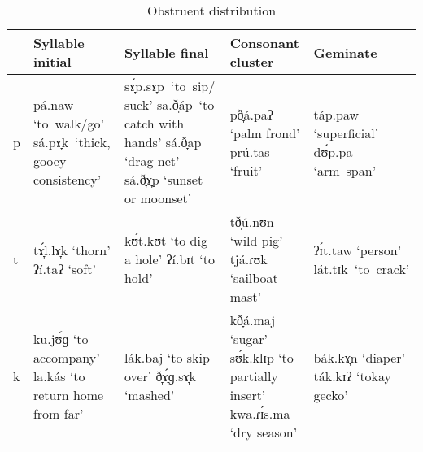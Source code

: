 \begin{table}[b]
\caption{Obstruent distribution}
\label{tab2.2} 
\begin{tabularx}{\textwidth}{lQQQQ}
\lsptoprule 
 & Syllable initial & Syllable final & Consonant cluster & Geminate \\
\midrule
 p & pá.naw \newline ‘to~walk/go’
 \newline 
 sá.pɤ̞k~\newline ‘thick, gooey consistency’ &
sɤ̞́p.sɤ̞p~\newline ‘to~sip/ suck’
\newline
sa.ð̞áp~\newline ‘to catch with hands’
\newline 
sá.ð̞ap \newline ‘drag net’
\newline sá.ð̞ɤ̞p \newline ‘sunset or moonset’ &
pð̞á.paʔ \newline ‘palm frond’
\newline 
prú.tas \newline ‘fruit’ &
táp.paw \newline ‘superficial’
\newline 
dʊ́p.pa \newline ‘arm~span’ \\
\tablevspace
 t & tɤ̞́l.lɤ̞k \newline ‘thorn’
\newline 
ʔí.taʔ \newline ‘soft’ &
kʊ́t.kʊt \newline ‘to dig a hole’
\newline
ʔí.bɪt \newline ‘to hold’ &
tð̞ú.nʊn \newline ‘wild pig’
\newline
tjá.ɾʊk \newline ‘sailboat mast’ &
ʔɪ́t.taw \newline ‘person’
\newline
lát.tɪk~\newline ‘to~crack’ \\
\tablevspace
 k & ku.jʊ́ɡ \newline ‘to accompany’
\newline
la.kás \newline ‘to return home from far’ &
lák.baj \newline ‘to skip over’
\newline 
ð̞ɤ̞́ɡ.sɤ̞k \newline ‘mashed’ &
kð̞á.maj \newline ‘sugar’
\newline
sʊ́k.klɪp \newline ‘to partially insert’
\newline
kwa.ɾɪ́s.ma \newline ‘dry season’ &
bák.kɤ̞n \newline ‘diaper’
\newline
ták.kɪʔ \newline ‘tokay gecko’ \\
\midrule
\end{tabularx}
\end{table}

